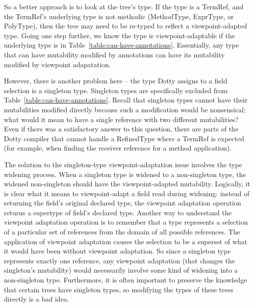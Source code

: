 \documentclass[11pt]{report}
\begin{document}
So a better approach is to look at the tree's type. If the type is a TermRef, and the TermRef's underlying type is not methodic (MethodType, ExprType, or PolyType), then the tree may need to be re-typed to reflect a viewpoint-adapted type. Going one step further, we know the type is viewpoint-adaptable if the underlying type is in Table~\ref{table:can-have-annotations}. Essentially, any type that can have mutability modified by annotations can have its mutability modified by viewpoint adapatation.

However, there is another problem here -- the type Dotty assigns to a field selection is a singleton type. Singleton types are specifically excluded from Table~\ref{table:can-have-annotations}. Recall that singleton types cannot have their mutabilities modified directly because such a modification would be nonsensical; what would it mean to have a single reference with two different mutabilities? Even if there was a satisfactory answer to this question, there are parts of the Dotty compiler that cannot handle a RefinedType where a TermRef is expected (for example, when finding the receiver reference for a method application).

The solution to the singleton-type viewpoint-adaptation issue involves the type widening process. When a singleton type is widened to a non-singleton type, the widened non-singleton should have the viewpoint-adapted mutability. Logically, it is clear what it means to viewpoint-adapt a field read during widening: instead of returning the field's original declared type, the viewpoint adaptation operation returns a supertype of field's declared type. Another way to understand the viewpoint adaptation operation is to remember that a type represents a selection of a particular set of references from the domain of all possible references. The application of viewpoint adaptation causes the selection to be a superset of what it would have been without viewpoint adaptation. So since a singleton type represents exactly one reference, any viewpoint adaptation (that changes the singleton's mutability) would necessarily involve some kind of widening into a non-singleton type. Furthermore, it is often important to preserve the knowledge that certain trees have singleton types, so modifying the types of these trees directly is a bad idea.
\end{document}

